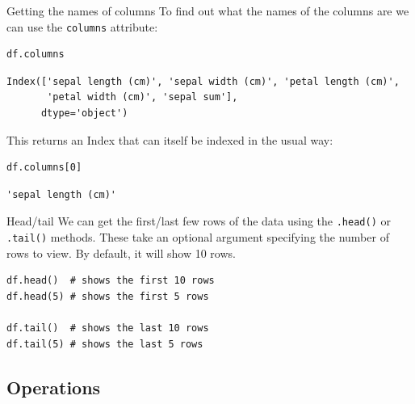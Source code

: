 \documentclass[10pt]{beamer}
\begin{document}
\begin{frame}[label={sec:org76d71f7},fragile]{Getting the names of columns}
 To find out what the names of the columns are we can use the \texttt{columns} attribute:

\begin{verbatim}
df.columns
\end{verbatim}

\begin{verbatim}
Index(['sepal length (cm)', 'sepal width (cm)', 'petal length (cm)',
       'petal width (cm)', 'sepal sum'],
      dtype='object')
\end{verbatim}

This returns an Index that can itself be indexed in the usual way:

\begin{verbatim}
df.columns[0]
\end{verbatim}

\begin{verbatim}
'sepal length (cm)'
\end{verbatim}
\end{frame}

\begin{frame}[label={sec:org12ee455},fragile]{Head/tail}
 We can get the first/last few rows of the data using the \texttt{.head()} or \texttt{.tail()}
methods. These take an optional argument specifying the number of rows to
view. By default, it will show 10 rows.

\begin{verbatim}
df.head()  # shows the first 10 rows
df.head(5) # shows the first 5 rows

df.tail()  # shows the last 10 rows
df.tail(5) # shows the last 5 rows
\end{verbatim}
\end{frame}


\subsection{Operations}
\label{sec:orgb7e7a10}
\end{document}
